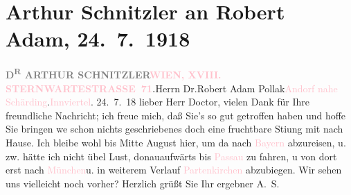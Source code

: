 

               \section[Arthur Schnitzler an Robert Adam, 24. 7. 1918]{ Arthur Schnitzler an Robert Adam, 24. 7. 1918}\nopagebreak{}\rehead{ }\normalsize\beginnumbering{} \toendnotes[C]{\smallbreak\pagebreak[2]} 
\pstart{}{\pb}\textcolor{gray}{\textbf{D\textsuperscript{R} ARTHUR
                                SCHNITZLER}}\pend{}\pstart{}\textcolor{gray}{\textbf{\textcolor{pink}{WIEN, XVIII. STERNWARTESTRASSE 71}{}\ledrightnote{\textcolor{pink}{Sternwartestraße}}.}}\pend{}{\bigskip}\pstart{}Herrn Dr.\pend{}\pstart{}Robert Adam Pollak\pend{}\pstart{}\textcolor{pink}{Andorf nahe Schärding}{}\ledrightnote{\textcolor{pink}{Andorf}}.\pend{}\pstart{}\textcolor{pink}{Innviertel}{}\ledrightnote{\textcolor{pink}{Innviertel}}.\pend{}{\bigskip}\pstart
           \raggedleft{}{\pb}24. 7. 18\pend
           \pstart
           lieber Herr Doctor,  vielen Dank für Ihre freundliche
                    Nachricht; ich freue mich, daß Sie’s so gut getroffen haben und hoffe Sie
                    bringen we{\geminationn} schon nichts geschriebenes doch eine
                    fruchtbare Sti{\geminationm}ung mit nach Hause. Ich bleibe wohl
                    bis Mitte August hier, um da{\geminationn} nach \textcolor{pink}{Bayern}{}\ledrightnote{\textcolor{pink}{Bayern}} abzureisen, u. zw. hätte ich nicht übel
                    Lust, donauaufwärts bis \textcolor{pink}{Passau}{}\ledrightnote{\textcolor{pink}{Passau}} zu fahren, u von dort erst nach \textcolor{pink}{München}{}\ledrightnote{\textcolor{pink}{München}}{ }{\pb}u. in weiterem Verlauf \textcolor{pink}{Partenkirchen}{}\ledrightnote{\textcolor{pink}{Partenkirchen}} abzubiegen. Wir sehen uns vielleicht noch vorher?
                    Herzlich grüßt Sie Ihr ergebner\pend
           \pstart \spacefill\mbox{A. S.}\pend{}\endnumbering{}  
      